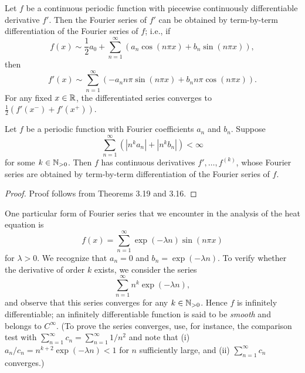 \begin{theorem}
    Let $f$ be a continuous periodic function with piecewise continuously differentiable derivative $f'$. Then the Fourier series of $f'$ can be obtained by term-by-term differentiation of the Fourier series of $f$; i.e., if
    \[f(x) \sim \frac{1}{2} a_0 + \sum_{n=1}^{\infty} \left(a_n \cos(n\pi x) + b_n \sin(n\pi x)\right),\]
    then
    \[f'(x) \sim \sum_{n=1}^{\infty} \left(-a_n n\pi \sin(n\pi x) + b_n n\pi \cos(n\pi x)\right).\]
    For any fixed $x \in \mathbb{R}$, the differentiated series converges to $\frac{1}{2}(f'(x^-) + f'(x^+))$.
\end{theorem}

\begin{theorem}
    Let $f$ be a periodic function with Fourier coefficients $a_n$ and $b_n$. Suppose
    \[\sum_{n=1}^{\infty} (|n^k a_n| + |n^k b_n|) < \infty\]
    for some $k \in \mathbb{N}_{>0}$. Then $f$ has continuous derivatives $f', \dots, f^{(k)}$, whose Fourier series are obtained by term-by-term differentiation of the Fourier series of $f$.
\end{theorem}
\begin{proof}
    Proof follows from Theorems 3.19 and 3.16.
\end{proof}

\begin{example}
    One particular form of Fourier series that we encounter in the analysis of the heat equation is
    \[f(x) = \sum_{n=1}^{\infty} \exp(-\lambda n) \sin(n\pi x)\]
    for $\lambda > 0$. We recognize that $a_n = 0$ and $b_n = \exp(-\lambda n)$. To verify whether the derivative of order $k$ exists, we consider the series
    \[\sum_{n=1}^{\infty} n^k \exp(-\lambda n),\]
    and observe that this series converges for any $k \in \mathbb{N}_{>0}$. Hence $f$ is infinitely differentiable; an infinitely differentiable function is said to be \textit{smooth} and belongs to $C^\infty$. (To prove the series converges, use, for instance, the comparison test with $\sum_{n=1}^{\infty} c_n = \sum_{n=1}^{\infty} 1/n^2$ and note that (i) $a_n / c_n = n^{k+2} \exp(-\lambda n) < 1$ for $n$ sufficiently large, and (ii) $\sum_{n=1}^{\infty} c_n$ converges.)
\end{example}

